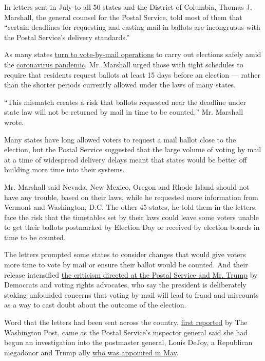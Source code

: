 In letters sent in July to all 50 states and the District of Columbia,
Thomas J. Marshall, the general counsel for the Postal Service, told
most of them that ``certain deadlines for requesting and casting mail-in
ballots are incongruous with the Postal Service's delivery standards.''

As many states
\href{https://www.nytimes3xbfgragh.onion/interactive/2020/08/11/us/politics/vote-by-mail-us-states.html}{turn
to vote-by-mail operations} to carry out elections safely amid the
\href{https://www.nytimes3xbfgragh.onion/interactive/2020/us/coronavirus-us-cases.html}{coronavirus
pandemic}, Mr. Marshall urged those with tight schedules to require that
residents request ballots at least 15 days before an election --- rather
than the shorter periods currently allowed under the laws of many
states.

``This mismatch creates a risk that ballots requested near the deadline
under state law will not be returned by mail in time to be counted,''
Mr. Marshall wrote.

Many states have long allowed voters to request a mail ballot close to
the election, but the Postal Service suggested that the large volume of
voting by mail at a time of widespread delivery delays meant that states
would be better off building more time into their systems.

Mr. Marshall said Nevada, New Mexico, Oregon and Rhode Island should not
have any trouble, based on their laws, while he requested more
information from Vermont and Washington, D.C. The other 45 states, he
told them in the letters, face the risk that the timetables set by their
laws could leave some voters unable to get their ballots postmarked by
Election Day or received by election boards in time to be counted.

The letters prompted some states to consider changes that would give
voters more time to vote by mail or ensure their ballot would be
counted. And their release intensified
\href{https://www.nytimes3xbfgragh.onion/2020/07/31/us/politics/trump-usps-mail-delays.html}{the
criticism directed at the Postal Service and Mr. Trump} by Democrats and
voting rights advocates, who say the president is deliberately stoking
unfounded concerns that voting by mail will lead to fraud and miscounts
as a way to cast doubt about the outcome of the election.

Word that the letters had been sent across the country,
\href{https://www.washingtonpost.com/local/md-politics/usps-states-delayed-mail-in-ballots/2020/08/14/64bf3c3c-dcc7-11ea-8051-d5f887d73381_story.html?hpid=hp_hp-top-table-high_uspsstates-230pm\%3Ahomepage\%2Fstory-ans}{first
reported} by The Washington Post, came as the Postal Service's inspector
general said she had begun an investigation into the postmaster general,
Louis DeJoy, a Republican megadonor and Trump ally
\href{https://www.nytimes3xbfgragh.onion/2020/05/07/us/politics/postmaster-general-louis-dejoy.html}{who
was appointed in May}.

